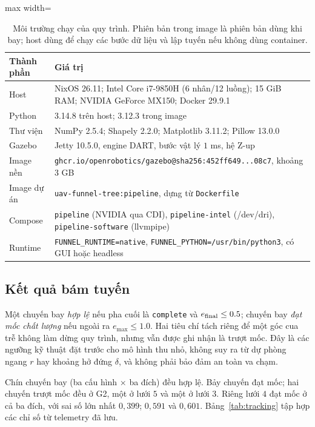\begin{table}[!t]
  \caption{Môi trường chạy của quy trình. Phiên bản trong image là phiên bản dùng
    khi bay; host dùng để chạy các bước dữ liệu và lập tuyến nếu không dùng
    container.}
  \label{tab:environment}
  {\fontsize{7}{8.6}\selectfont
  \begin{adjustbox}{max width=\textwidth}
  \begin{tabular}{@{}lp{300pt}@{}}
    \toprule
    Thành phần & Giá trị \\
    \midrule
    Host & NixOS 26.11; Intel Core i7-9850H (6 nhân/12 luồng); 15 GiB RAM;
      NVIDIA GeForce MX150; Docker 29.9.1 \\
    Python & 3.14.8 trên host; 3.12.3 trong image \\
    Thư viện & NumPy 2.5.4; Shapely 2.2.0; Matplotlib 3.11.2; Pillow 13.0.0 \\
    Gazebo & Jetty 10.5.0, engine DART, bước vật lý $1$ ms, hệ Z-up \\
    Image nền & \texttt{ghcr.io/openrobotics/gazebo@sha256:452ff649...08c7},
      khoảng 3 GB \\
    Image dự án & \texttt{uav-funnel-tree:pipeline}, dựng từ \texttt{Dockerfile} \\
    Compose & \texttt{pipeline} (NVIDIA qua CDI), \texttt{pipeline-intel}
      (/dev/dri), \texttt{pipeline-software} (llvmpipe) \\
    Runtime & \texttt{FUNNEL\_RUNTIME=native}, \texttt{FUNNEL\_PYTHON=/usr/bin/python3},
      có GUI hoặc headless \\
    \bottomrule
  \end{tabular}
  \end{adjustbox}}
\end{table}

\subsection{Kết quả bám tuyến}\label{sec:stage-validate}

Một chuyến bay \emph{hợp lệ} nếu pha cuối là \texttt{complete} và
$e_{\rm final}\le\num{0.5}$; chuyến bay \emph{đạt mốc chất lượng} nếu ngoài ra
$e_{\max}\le\num{1.0}$. Hai tiêu chí tách riêng để một góc cua trễ không làm dừng
quy trình, nhưng vẫn được ghi nhận là trượt mốc. Đây là các ngưỡng kỹ thuật đặt
trước cho mô hình thu nhỏ, không suy ra từ dự phòng ngang $r$ hay khoảng hở đứng
$\delta$, và không phải bảo đảm an toàn va chạm.

Chín chuyến bay (ba cấu hình $\times$ ba đích) đều hợp lệ. Bảy chuyến đạt mốc;
hai chuyến trượt mốc đều ở G2, một ở lưới $5$ và một ở lưới $3$. Riêng lưới $4$
đạt mốc ở cả ba đích, với sai số lớn nhất $0{,}399$; $0{,}591$ và $0{,}601$.
Bảng~\ref{tab:tracking} tập hợp các chỉ số từ telemetry đã lưu.

